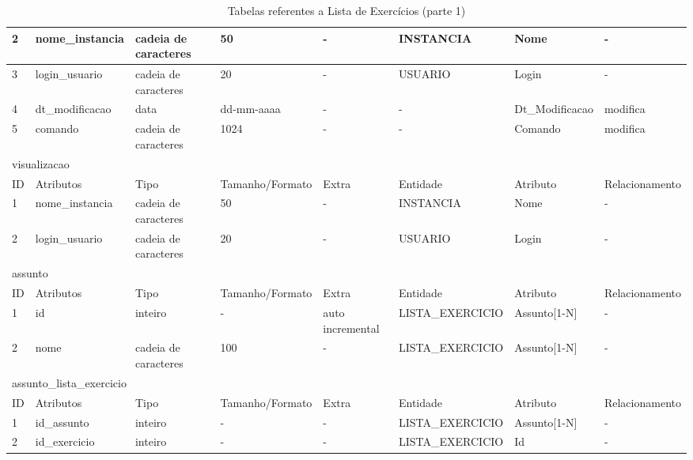 \documentclass[graduacao,brazil]{ThesisPUC}
\begin{document}
\begin{table}[H]
{\begin{tabular}{|l|l|l|l|l|l|l|l|}
    2                       & nome\_instancia & cadeia de caracteres & 50              & -                & INSTANCIA       & Nome           & -               \\ \hline
    3                       & login\_usuario & cadeia de caracteres & 20              & -                & USUARIO         & Login          & -               \\ \hline
    4                       & dt\_modificacao & data                 & dd-mm-aaaa      & -                & -               & Dt\_Modificacao & modifica        \\ \hline
    5                       & comando        & cadeia de caracteres & 1024            & -                & -               & Comando        & modifica        \\ \hline
    \multicolumn{8}{|l|}{visualizacao} \\ \hline
    ID                      & Atributos      & Tipo                 & Tamanho/Formato & Extra            & Entidade        & Atributo       & Relacionamento  \\ \hline
    1                       & nome\_instancia & cadeia de caracteres & 50              & -                & INSTANCIA       & Nome           & -               \\ \hline
    2                       & login\_usuario & cadeia de caracteres & 20              & -                & USUARIO         & Login          & -               \\ \hline
    \multicolumn{8}{|l|}{assunto} \\ \hline
    ID                      & Atributos      & Tipo                 & Tamanho/Formato & Extra            & Entidade        & Atributo       & Relacionamento  \\ \hline
    1                       & id             & inteiro              & -               & auto incremental & LISTA\_EXERCICIO & Assunto[1-N]   & -               \\ \hline
    2                       & nome           & cadeia de caracteres & 100             & -                & LISTA\_EXERCICIO & Assunto[1-N]   & -               \\ \hline
    \multicolumn{8}{|l|}{assunto\_lista\_exercicio} \\ \hline
    ID                      & Atributos      & Tipo                 & Tamanho/Formato & Extra            & Entidade        & Atributo       & Relacionamento  \\ \hline
    1                       & id\_assunto    & inteiro              & -               & -                & LISTA\_EXERCICIO & Assunto[1-N]   & -               \\ \hline
    2                       & id\_exercicio  & inteiro              & -               & -                & LISTA\_EXERCICIO & Id             & -               \\ \hline
    \end{tabular}
    }
    \caption {Tabelas referentes a Lista de Exerc\'{i}cios (parte 1)}
\end{table}
\end{document}
